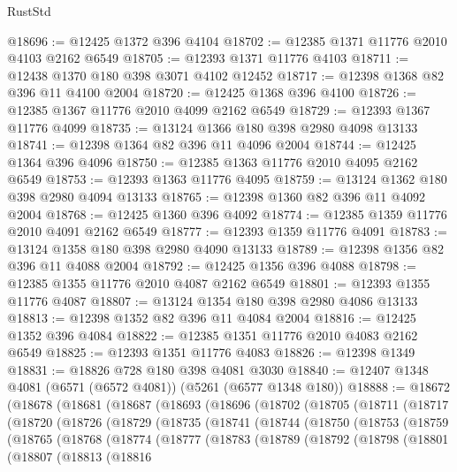\begin{lexlean}{RustStd}
\begin{coremodule}
@18696 := @12425 @1372 @396 @4104
@18702 := @12385 @1371 @11776 @2010 @4103 @2162 @6549
@18705 := @12393 @1371 @11776 @4103
@18711 := @12438 @1370 @180 @398 @3071 @4102 @12452
@18717 := @12398 @1368 @82 @396 @11 @4100 @2004
@18720 := @12425 @1368 @396 @4100
@18726 := @12385 @1367 @11776 @2010 @4099 @2162 @6549
@18729 := @12393 @1367 @11776 @4099
@18735 := @13124 @1366 @180 @398 @2980 @4098 @13133
@18741 := @12398 @1364 @82 @396 @11 @4096 @2004
@18744 := @12425 @1364 @396 @4096
@18750 := @12385 @1363 @11776 @2010 @4095 @2162 @6549
@18753 := @12393 @1363 @11776 @4095
@18759 := @13124 @1362 @180 @398 @2980 @4094 @13133
@18765 := @12398 @1360 @82 @396 @11 @4092 @2004
@18768 := @12425 @1360 @396 @4092
@18774 := @12385 @1359 @11776 @2010 @4091 @2162 @6549
@18777 := @12393 @1359 @11776 @4091
@18783 := @13124 @1358 @180 @398 @2980 @4090 @13133
@18789 := @12398 @1356 @82 @396 @11 @4088 @2004
@18792 := @12425 @1356 @396 @4088
@18798 := @12385 @1355 @11776 @2010 @4087 @2162 @6549
@18801 := @12393 @1355 @11776 @4087
@18807 := @13124 @1354 @180 @398 @2980 @4086 @13133
@18813 := @12398 @1352 @82 @396 @11 @4084 @2004
@18816 := @12425 @1352 @396 @4084
@18822 := @12385 @1351 @11776 @2010 @4083 @2162 @6549
@18825 := @12393 @1351 @11776 @4083
@18826 := @12398 @1349
@18831 := @18826 @728 @180 @398 @4081 @3030
@18840 := @12407 @1348 @4081 (@6571 (@6572 @4081)) (@5261 (@6577 @1348 @180))
@18888 := @18672
    (@18678
      (@18681
        (@18687
          (@18693
            (@18696
              (@18702
                (@18705
                  (@18711
                    (@18717
                      (@18720
                        (@18726
                          (@18729
                            (@18735
                              (@18741
                                (@18744
                                  (@18750
                                    (@18753
                                      (@18759
                                        (@18765
                                          (@18768
                                            (@18774
                                              (@18777
                                                (@18783
                                                  (@18789
                                                    (@18792
                                                      (@18798
                                                        (@18801
                                                          (@18807
                                                            (@18813
                                                              (@18816

\end{coremodule}
\end{lexlean}
